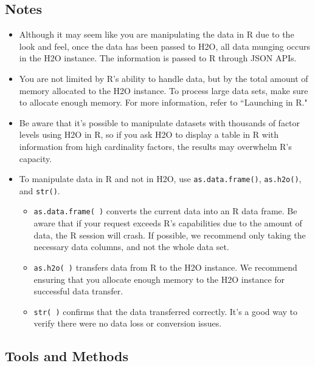 \documentclass[11pt]{article}
\begin{document}
\subsection{Notes}
\begin{itemize}

\item Although it may seem like you are manipulating the data in R due to the look and feel, once the data has been passed to H2O, all data munging occurs in the H2O instance. The information is passed to R through JSON APIs. 
\item You are not limited by R's ability to handle data, but by the total amount of memory allocated to the H2O instance. To process large data sets, make sure to allocate enough memory. For more information, refer to ``Launching in R." 
\item Be aware that it’s possible to manipulate datasets with thousands of factor levels using H2O in R, so if you ask H2O to display a table in R with information from high cardinality factors, the results may overwhelm R's capacity. 
\item To manipulate data in R and not in H2O, use {\texttt{as.data.frame()}}, {\texttt{as.h2o()}}, and {\texttt{str()}}. \begin{itemize}
\item {\texttt{as.data.frame( )}} converts the current data into an R data frame. Be aware that if your request exceeds R’s capabilities due to the amount of data, the R session will crash. If possible, we recommend only taking the necessary data columns, and not the whole data set. 
\item {\texttt{as.h2o( )}} transfers data from R to the H2O instance. We recommend ensuring that you allocate enough memory to the H2O instance for successful data transfer.
\item {\texttt{str( )}} confirms that the data transferred correctly. It’s a good way to verify there were no data loss or conversion issues. 
\end{itemize}
\end{itemize}

\subsection{Tools and Methods}
\end{document}
